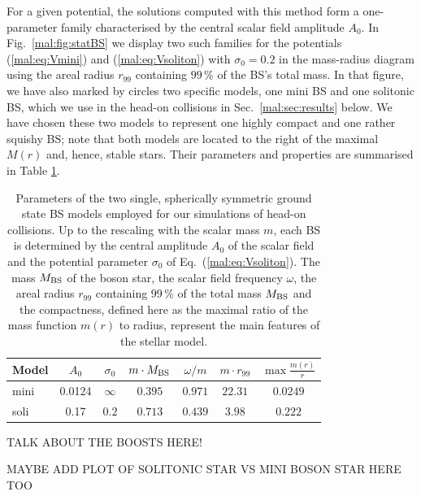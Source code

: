 For a given potential, the solutions computed with this method
form a one-parameter family characterised
by the central scalar field amplitude ${A}_0$. In
Fig.~\ref{mal:fig:statBS} we display two such families for the
potentials (\ref{mal:eq:Vmini}) and (\ref{mal:eq:Vsoliton}) with ${\sigma}_0=0.2$ in the
mass-radius diagram using the areal radius ${r}_{99}$ containing
$99\,\%$ of the BS's total mass. In that figure, we have also marked
by circles two specific models, one mini BS and one solitonic BS,
which we use in the head-on collisions in Sec.~\ref{mal:sec:results} below.
We have chosen these two models to represent one highly compact and
one rather squishy BS; note that both models are located
to the right of the maximal ${M}({r})$ and, hence, stable stars.
Their parameters and properties are summarised in Table
\ref{mal:tab:models}.
%
\begin{table}
    \centering
    \begin{tabular}{l|cccccc}
    \hline
    Model & $A_0$ & $\sigma_0$ & $m\cdot M_{\rm BS}$ & $\omega/m$ & $m \cdot r_{99}$ & $\max\frac{m(r)}{r}$  \\
    \hline
    mini & 0.0124 & $\infty$ & $0.395$ & $0.971$ & $22.31$ & $0.0249$ \\
    soli & 0.17 & $0.2$ & $0.713$ & $0.439$ & $3.98$ & $0.222$ \\
    \hline
    \end{tabular}
    \caption{Parameters of the two single, spherically symmetric
    ground state BS models employed for our simulations of
    head-on collisions. Up to the rescaling with the scalar mass
    $m$, each BS is determined by the central amplitude
    $A_0$ of the scalar field and the potential parameter
    $\sigma_0$ of Eq.~(\ref{mal:eq:Vsoliton}). The mass $M_{\rm BS}$ of the boson star,
    the scalar field frequency $\omega$, the areal radius $r_{99}$ containing
    $99\,\%$ of the total mass $M_{\rm BS}$ and the compactness, defined here
    as the maximal ratio of the mass function $m(r)$ to radius, represent
    the main features of the stellar model.}
    \label{mal:tab:models}
\end{table}
%



TALK ABOUT THE BOOSTS HERE!

MAYBE ADD PLOT OF SOLITONIC STAR VS MINI BOSON STAR HERE TOO





